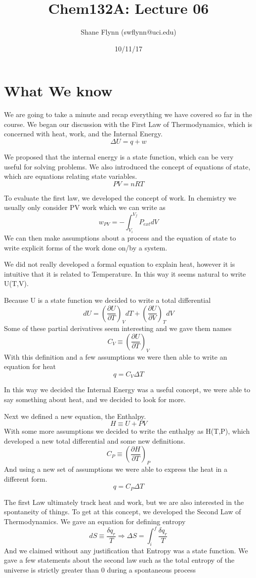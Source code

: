 \documentclass{article}
\title{Chem132A: Lecture 06}
\author{Shane Flynn (swflynn@uci.edu) }
\date{10/11/17}
\newcommand{\be}{\begin{equation}}
\newcommand{\ee}{\end{equation}}
\newcommand{\pd}{\partial}
\begin{document}
\maketitle

\section*{What We know}
We are going to take a minute and recap everything we have covered so far in the course. 
We began our discussion with the First Law of Thermodynamics, which is concerned with heat, work, and the Internal Energy. 
\be
\Delta U = q + w
\ee

We proposed that the internal energy is a state function, which can be very useful for solving problems. 
We also introduced the concept of equations of state, which are equations relating state variables. 
\be
PV = nRT
\ee

To evaluate the first law, we developed the concept of work.
In chemistry we usually only consider PV work which we can write as
\be
w_{PV} = -\int_{V_i}^{V_f}P_{ext}dV
\ee
We can then make assumptions about a process and the equation of state to write explicit forms of the work done on/by a system. 

We did not really  developed a formal equation to explain heat, however it is intuitive that it is related to Temperature. 
In this way it seems natural to write U(T,V). 

Because U is a state function we decided to write a total differential
\be
dU = \left(\frac{\pd U}{\pd T}\right)_VdT + \left(\frac{\pd U}{\pd V}\right)_T dV 
\ee
Some of these partial derivatives seem interesting and we gave them names
\be
C_V \equiv \left(\frac{\pd U}{\pd T}\right)_V
\ee
With this definition and a few assumptions we were then able to write an equation for heat
\be
q = C_V\Delta T
\ee

In this way we decided the Internal Energy was a useful concept, we were able to say something about heat, and we decided to look for more. 

Next we defined a new equation, the Enthalpy. 
\be
H \equiv U + PV
\ee
With some more assumptions we decided to write the enthalpy as H(T,P), which developed a new total differential and some new definitions. 
\be
C_P \equiv \left(\frac{\pd H}{\pd T}\right)_P
\ee
And using a new set of assumptions we were able to express the heat in a different form. 
\be
q = C_P\Delta T
\ee

The first Law ultimately track heat and work, but we are also interested in the spontaneity of things. 
To get at this concept, we developed the Second Law of Thermodynamics. 
We gave an equation for defining entropy
\be
dS \equiv \frac{\delta q_r}{T} \Rightarrow \Delta S = \int_i^f \frac{\delta q_r}{T}
\ee
And we claimed without any justification that Entropy was a state function. 
We gave a few statements about the second law such as the total entropy of the universe is strictly greater than 0 during a spontaneous process
\end{document}
